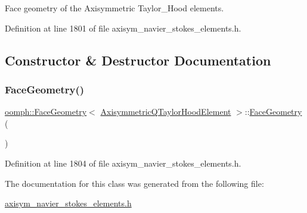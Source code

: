 Face geometry of the Axisymmetric Taylor\+\_\+\+Hood elements. 

Definition at line 1801 of file axisym\+\_\+navier\+\_\+stokes\+\_\+elements.\+h.



\subsection{Constructor \& Destructor Documentation}
\mbox{\label{classoomph_1_1FaceGeometry_3_01AxisymmetricQTaylorHoodElement_01_4_ac2c2aa1d350727d95fde8d188f96aae1}} 
\subsubsection{\texorpdfstring{Face\+Geometry()}{FaceGeometry()}}
{\footnotesize\ttfamily \hyperlink{classoomph_1_1FaceGeometry}{oomph\+::\+Face\+Geometry}$<$ \hyperlink{classoomph_1_1AxisymmetricQTaylorHoodElement}{Axisymmetric\+Q\+Taylor\+Hood\+Element} $>$\+::\hyperlink{classoomph_1_1FaceGeometry}{Face\+Geometry} (\begin{DoxyParamCaption}{ }\end{DoxyParamCaption})\hspace{0.3cm}{\ttfamily [inline]}}



Definition at line 1804 of file axisym\+\_\+navier\+\_\+stokes\+\_\+elements.\+h.



The documentation for this class was generated from the following file\+:\begin{DoxyCompactItemize}
\item 
\hyperlink{axisym__navier__stokes__elements_8h}{axisym\+\_\+navier\+\_\+stokes\+\_\+elements.\+h}\end{DoxyCompactItemize}
